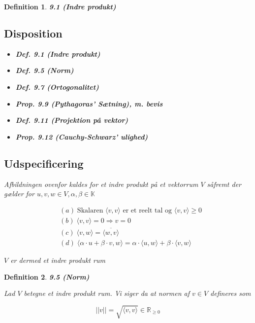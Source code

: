 \documentclass[paper=a4, fontsize=11pt]{scrartcl} %
\newtheorem*{definition}{Definition}
\newenvironment{cstmdefinition}[1]{\begin{definition} {\normalfont\textbf{#1}}}{\end{definition}}
\begin{document}
	\begin{cstmdefinition}{9.1 (Indre produkt)}
		
		\subsection{Disposition}
		
		\begin{itemize}
			\item \textbf{Def. 9.1 (Indre produkt)}
			\item \textbf{Def. 9.5 (Norm)}
			\item \textbf{Def. 9.7 (Ortogonalitet)}
			\item \textbf{Prop. 9.9 (Pythagoras' Sætning), m. bevis}
			\item \textbf{Def. 9.11 (Projektion på vektor)}
			\item \textbf{Prop. 9.12 (Cauchy-Schwarz' ulighed)}
		\end{itemize}
		
		\subsection{Udspecificering}
		
		Afbildningen ovenfor kaldes for et indre produkt på et vektorrum $V$ såfremt der gælder for $u,v,w \in V, \alpha,\beta \in \mathbb{K}$
		
		\begin{align*}
		&(a) \; \mbox{Skalaren } \langle v,v \rangle \mbox{ er et reelt tal og } \langle v,v \rangle \geq 0\\
		&(b) \; \langle v,v \rangle = 0 \Rightarrow v = 0\\
		&(c) \; \langle v,w \rangle = \overline{\langle w,v \rangle}\\
		&(d) \; \langle \alpha \cdot u + \beta \cdot v, w \rangle = \alpha \cdot \langle u,w \rangle + \beta \cdot \langle v,w \rangle
		\end{align*}
		
		$V$ er dermed et indre produkt rum
		
	\end{cstmdefinition}
	
	
	\begin{cstmdefinition}{9.5 (Norm)}
		
		
		Lad $V$ betegne et indre produkt rum. Vi siger da at normen af $v \in V$ defineres som
		
		\[||v|| = \sqrt{\langle v,v \rangle} \in \mathbb{R}_{\geq 0}\]
		
	\end{cstmdefinition}
	
\end{document}
